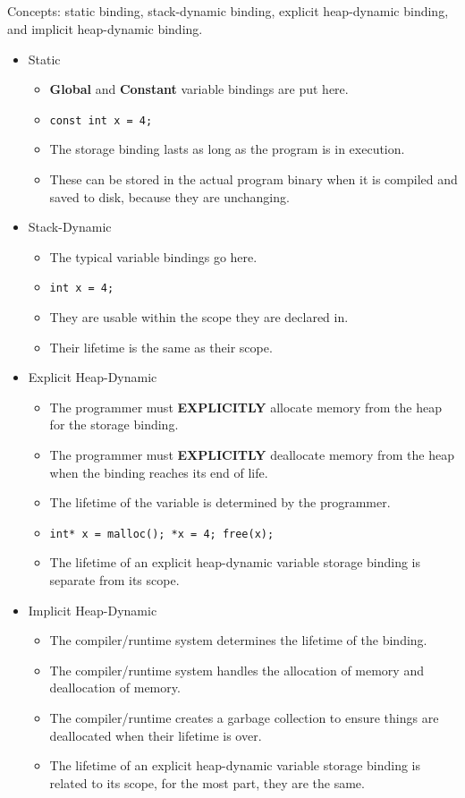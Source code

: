 \subsection{}
Concepts: static binding, stack-dynamic binding, explicit heap-dynamic binding, and implicit heap-dynamic binding.
\begin{itemize}
\item Static
  \begin{itemize}[noitemsep]
  \item \textbf{Global} and \textbf{Constant} variable bindings are put here.
  \item \texttt{const int x = 4;}
  \item The storage binding lasts as long as the program is in execution.
  \item These can be stored in the actual program binary when it is compiled and saved to disk, because they are unchanging.
  \end{itemize}

\item Stack-Dynamic
  \begin{itemize}[noitemsep]
  \item The typical variable bindings go here.
  \item \texttt{int x = 4;}
  \item They are usable within the scope they are declared in.
  \item Their lifetime is the same as their scope.
  \end{itemize}

\item Explicit Heap-Dynamic
  \begin{itemize}[noitemsep]
  \item The programmer must \textbf{EXPLICITLY} allocate memory from the heap for the storage binding.
  \item The programmer must \textbf{EXPLICITLY} deallocate memory from the heap when the binding reaches its end of life.
  \item The lifetime of the variable is determined by the programmer.
  \item \texttt{int* x = malloc(); *x = 4; free(x);}
  \item The lifetime of an explicit heap-dynamic variable storage binding is separate from its scope.
  \end{itemize}

\item Implicit Heap-Dynamic
  \begin{itemize}[noitemsep]
  \item The compiler/runtime system determines the lifetime of the binding.
  \item The compiler/runtime system handles the allocation of memory and deallocation of memory.
  \item The compiler/runtime creates a garbage collection to ensure things are deallocated when their lifetime is over.
  \item The lifetime of an explicit heap-dynamic variable storage binding is related to its scope, for the most part, they are the same.
  \end{itemize}
\end{itemize}

